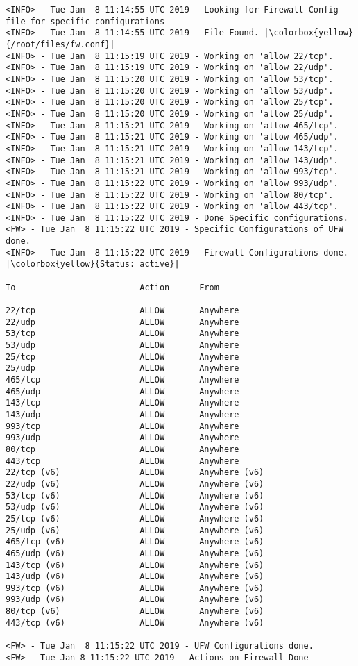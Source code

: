 \begin{lstlisting}[escapeinside=||]
<INFO> - Tue Jan  8 11:14:55 UTC 2019 - Looking for Firewall Config file for specific configurations
<INFO> - Tue Jan  8 11:14:55 UTC 2019 - File Found. |\colorbox{yellow}{/root/files/fw.conf}|
<INFO> - Tue Jan  8 11:15:19 UTC 2019 - Working on 'allow 22/tcp'.
<INFO> - Tue Jan  8 11:15:19 UTC 2019 - Working on 'allow 22/udp'.
<INFO> - Tue Jan  8 11:15:20 UTC 2019 - Working on 'allow 53/tcp'.
<INFO> - Tue Jan  8 11:15:20 UTC 2019 - Working on 'allow 53/udp'.
<INFO> - Tue Jan  8 11:15:20 UTC 2019 - Working on 'allow 25/tcp'.
<INFO> - Tue Jan  8 11:15:20 UTC 2019 - Working on 'allow 25/udp'.
<INFO> - Tue Jan  8 11:15:21 UTC 2019 - Working on 'allow 465/tcp'.
<INFO> - Tue Jan  8 11:15:21 UTC 2019 - Working on 'allow 465/udp'.
<INFO> - Tue Jan  8 11:15:21 UTC 2019 - Working on 'allow 143/tcp'.
<INFO> - Tue Jan  8 11:15:21 UTC 2019 - Working on 'allow 143/udp'.
<INFO> - Tue Jan  8 11:15:21 UTC 2019 - Working on 'allow 993/tcp'.
<INFO> - Tue Jan  8 11:15:22 UTC 2019 - Working on 'allow 993/udp'.
<INFO> - Tue Jan  8 11:15:22 UTC 2019 - Working on 'allow 80/tcp'.
<INFO> - Tue Jan  8 11:15:22 UTC 2019 - Working on 'allow 443/tcp'.
<INFO> - Tue Jan  8 11:15:22 UTC 2019 - Done Specific configurations.
<FW> - Tue Jan  8 11:15:22 UTC 2019 - Specific Configurations of UFW done.
<INFO> - Tue Jan  8 11:15:22 UTC 2019 - Firewall Configurations done.
|\colorbox{yellow}{Status: active}|

To                         Action      From
--                         ------      ----
22/tcp                     ALLOW       Anywhere
22/udp                     ALLOW       Anywhere
53/tcp                     ALLOW       Anywhere
53/udp                     ALLOW       Anywhere
25/tcp                     ALLOW       Anywhere
25/udp                     ALLOW       Anywhere
465/tcp                    ALLOW       Anywhere
465/udp                    ALLOW       Anywhere
143/tcp                    ALLOW       Anywhere
143/udp                    ALLOW       Anywhere
993/tcp                    ALLOW       Anywhere
993/udp                    ALLOW       Anywhere
80/tcp                     ALLOW       Anywhere
443/tcp                    ALLOW       Anywhere
22/tcp (v6)                ALLOW       Anywhere (v6)
22/udp (v6)                ALLOW       Anywhere (v6)
53/tcp (v6)                ALLOW       Anywhere (v6)
53/udp (v6)                ALLOW       Anywhere (v6)
25/tcp (v6)                ALLOW       Anywhere (v6)
25/udp (v6)                ALLOW       Anywhere (v6)
465/tcp (v6)               ALLOW       Anywhere (v6)
465/udp (v6)               ALLOW       Anywhere (v6)
143/tcp (v6)               ALLOW       Anywhere (v6)
143/udp (v6)               ALLOW       Anywhere (v6)
993/tcp (v6)               ALLOW       Anywhere (v6)
993/udp (v6)               ALLOW       Anywhere (v6)
80/tcp (v6)                ALLOW       Anywhere (v6)
443/tcp (v6)               ALLOW       Anywhere (v6)

<FW> - Tue Jan  8 11:15:22 UTC 2019 - UFW Configurations done.
<FW> - Tue Jan 8 11:15:22 UTC 2019 - Actions on Firewall Done
\end{lstlisting}
\newpage

